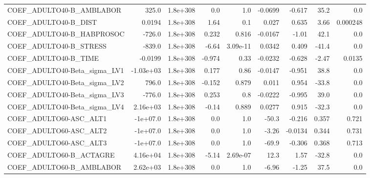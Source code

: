 \begin{tabular}{lrrrrrrrr}
COEF\_ADULTO40-B\_AMBLABOR          &       325.0 &     1.8e+308 &      0.0 &      1.0 &    -0.0699 &      -0.617 &         35.2 &           0.0 \\
COEF\_ADULTO40-B\_DIST              &      0.0194 &     1.8e+308 &     1.64 &      0.1 &      0.027 &       0.635 &         3.66 &      0.000248 \\
COEF\_ADULTO40-B\_HABPROSOC         &      -726.0 &     1.8e+308 &    0.232 &    0.816 &    -0.0167 &       -1.01 &         42.1 &           0.0 \\
COEF\_ADULTO40-B\_STRESS            &      -839.0 &     1.8e+308 &    -6.64 & 3.09e-11 &     0.0342 &       0.409 &        -41.4 &           0.0 \\
COEF\_ADULTO40-B\_TIME              &     -0.0199 &     1.8e+308 &   -0.974 &     0.33 &    -0.0232 &      -0.628 &        -2.47 &        0.0135 \\
COEF\_ADULTO40-Beta\_sigma\_LV1      &   -1.03e+03 &     1.8e+308 &    0.177 &     0.86 &    -0.0147 &      -0.951 &         38.8 &           0.0 \\
COEF\_ADULTO40-Beta\_sigma\_LV2      &       796.0 &     1.8e+308 &   -0.152 &    0.879 &      0.011 &       0.954 &        -33.8 &           0.0 \\
COEF\_ADULTO40-Beta\_sigma\_LV3      &      -776.0 &     1.8e+308 &    0.253 &      0.8 &    -0.0222 &      -0.995 &         39.0 &           0.0 \\
COEF\_ADULTO40-Beta\_sigma\_LV4      &    2.16e+03 &     1.8e+308 &    -0.14 &    0.889 &     0.0277 &       0.915 &        -32.3 &           0.0 \\
COEF\_ADULTO60-ASC\_ALT1            &    -1e+07.0 &     1.8e+308 &      0.0 &      1.0 &      -50.3 &      -0.216 &        0.357 &         0.721 \\
COEF\_ADULTO60-ASC\_ALT2            &    -1e+07.0 &     1.8e+308 &      0.0 &      1.0 &      -3.26 &     -0.0134 &        0.344 &         0.731 \\
COEF\_ADULTO60-ASC\_ALT3            &    -1e+07.0 &     1.8e+308 &      0.0 &      1.0 &      -69.9 &      -0.306 &        0.368 &         0.713 \\
COEF\_ADULTO60-B\_ACTAGRE           &    4.16e+04 &     1.8e+308 &    -5.14 & 2.69e-07 &       12.3 &        1.57 &        -32.8 &           0.0 \\
COEF\_ADULTO60-B\_AMBLABOR          &    2.62e+03 &     1.8e+308 &      0.0 &      1.0 &      -6.96 &       -1.25 &         37.5 &           0.0 \\

\end{tabular}
